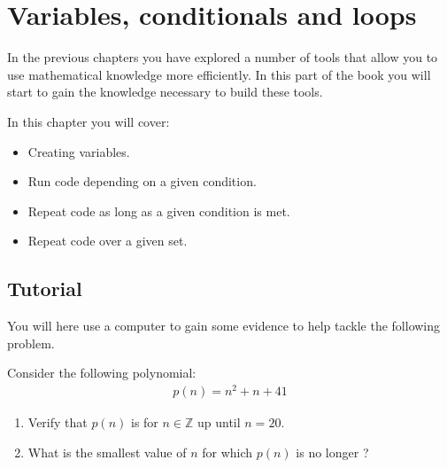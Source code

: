 \chapter{Variables, conditionals and loops}
\label{chp:variables_conditionals_and_loops}

In the previous chapters you have explored a number of tools that allow you to use
mathematical knowledge more efficiently. In this part of the book you will
start to gain the knowledge necessary to build these tools.



\begin{note}
In this chapter you will cover:
\begin{itemize}
\item 

Creating variables.

\item 

Run code depending on a given condition.

\item 

Repeat code as long as a given condition is met.

\item 

Repeat code over a given set.

\end{itemize}
\end{note}





\section{Tutorial}
\label{\detokenize{building-tools/01-variables-conditionals-loops/tutorial/main:tutorial}}\label{\detokenize{building-tools/01-variables-conditionals-loops/tutorial/main::doc}}

You will here use a computer to gain some evidence to help tackle the following
problem.




Consider the following polynomial:
\begin{equation*}
\begin{split}
    p(n) = n ^ 2 + n + 41
\end{split}
\end{equation*}\begin{enumerate}

\item 

Verify that \(p(n)\) is  for \(n\in \mathbb{Z}\) up until \(n=20\).

\item 

What is the smallest value of \(n\) for which \(p(n)\) is no longer ?

\end{enumerate}



